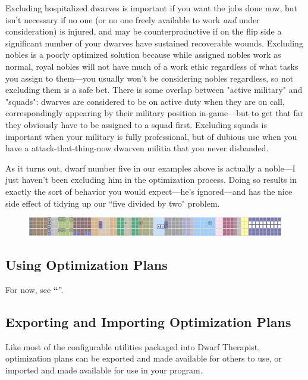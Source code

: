 \documentclass[]{article}
\newcommand{\jump}[1] {\textbf{``\nameref{sec:#1}}''}
\begin{document}
Excluding hospitalized dwarves is important if you want the jobs done now, but isn't necessary if no one
(or no one freely available to work \emph{and} under consideration) is injured, and may be
counterproductive if on the flip side a significant number of your dwarves have sustained recoverable
wounds. Excluding nobles is a poorly optimized solution because while assigned nobles work as normal,
royal nobles will not have much of a work ethic regardless of what tasks you assign to them---you usually
won't be considering nobles regardless, so not excluding them is a safe bet. There is some overlap
between "active military" and "squads": dwarves are considered to be on active duty when they are on
call, correspondingly appearing by their military position in-game---but to get that far they obviously
have to be assigned to a squad first. Excluding squads is important when your military is fully
professional, but of dubious use when you have a attack-that-thing-now dwarven militia that you never
disbanded.

As it turns out, dwarf number five in our examples above is actually a noble---I just haven't been
excluding him in the optimization process. Doing so results in exactly the sort of behavior you would
expect---he's ignored---and has the nice side effect of tidying up our ``five divided by two" problem.
\begin{figure}[h!] \centering \includegraphics[width=\linewidth]{Sec4Fig15}
\end{figure}

\subsection{Using Optimization Plans}
\label{Using Optimization Plans}

For now, see \jump{Putting it all Together}.

\subsection{Exporting and Importing Optimization Plans}
\label{sec:Exporting and Importing Optimization Plans}

Like most of the configurable utilities packaged into Dwarf Therapist, optimization plans can be exported
and made available for others to use, or imported and made available for use in your program.
\end{document}
